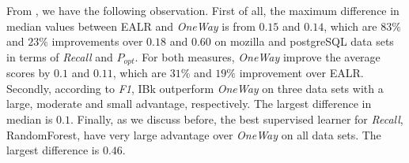 \begin{table}[]
    \centering
    \caption{Best Supervised Learner(A) vs. OneWay(B)}
    \label{tab:unsup_oneway}
\end{table}

From ,  we have the following observation.
First of all, the maximum  difference in median values between 
EALR and {\it OneWay} is from $0.15$ and $0.14$, which are $83\%$ and $23\%$ improvements
over $0.18$ and $0.60$ on mozilla and postgreSQL data sets in terms of {\it Recall} and ${P_{opt}}$.
For both measures, {\it OneWay} improve the average scores by $0.1$ and $0.11$, which are
$31\%$ and $19\%$ improvement over EALR. Secondly, according to {\it F1}, IBk outperform
{\it OneWay}  on three data sets with a large, moderate and small advantage, respectively.
The largest difference in median is $0.1$. Finally, as we discuss before, the best 
supervised learner for {\it Recall}, RandomForest, have very large advantage over
{\it OneWay} on all data sets. The largest difference is $0.46$.


